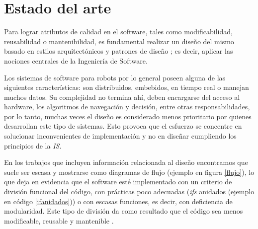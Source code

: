 %
%


\chapter{Estado del arte}
\label{estadoDelArte}


Para lograr atributos de calidad en el software, tales como modificabilidad, reusabilidad o mantenibilidad, es fundamental realizar un diseño del mismo basado en estilos arquitectónicos y patrones de diseño \cite{Gamma:1995:DPE:186897,shawgarlan,buschmann}; es decir, aplicar las nociones centrales de la Ingeniería de Software.

Los sistemas de software para robots por lo general poseen alguna de las siguientes características: son distribuidos, embebidos, en tiempo real o manejan muchos datos. Su complejidad no termina ahí, deben encargarse del acceso al hardware, los algoritmos de navegación y decisión, entre otras responsabilidades, por lo tanto, muchas veces el diseño es considerado menos prioritario por quienes desarrollan este tipo de sistemas. Esto provoca que el esfuerzo se concentre en solucionar inconvenientes de implementación y no en diseñar cumpliendo los principios de la \textit{IS}.

En los trabajos que incluyen información relacionada al diseño \cite{bad-desing-auto,bad-desing-implantable,code-1,code-2,Zhang2009,bad-design-uml,bad-design-robot} encontramos que suele ser escasa y mostrarse como diagramas de flujo (ejemplo en figura \ref{flujo}), lo que deja en evidencia que el software esté implementado con un criterio de división funcional del código, con prácticas poco adecuadas (\textit{ifs} anidados (ejemplo en código \ref{ifanidados})) o con escasas funciones, es decir, con deficiencia de modularidad. Este tipo de división da como resultado que el código sea menos modificable, reusable y mantenible \cite{parnas72}.

